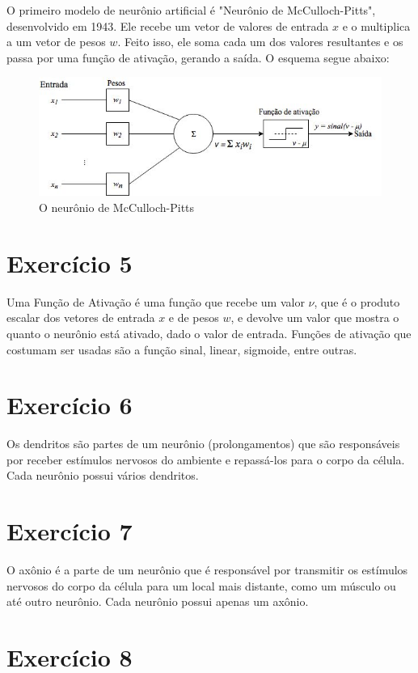 \documentclass[a4]{article}
\begin{document}
O primeiro modelo de neurônio artificial é "Neurônio de McCulloch-Pitts", desenvolvido em 1943. Ele recebe um vetor de valores de entrada $ x $ e o multiplica a um vetor de pesos $ w $. Feito isso, ele soma cada um dos valores resultantes e os passa por uma função de ativação, gerando a saída. O esquema segue abaixo:

\begin{figure}[H]
	\centering
	\includegraphics[width=0.8\linewidth]{neuronio.jpg}
	\caption{O neurônio de McCulloch-Pitts}
\end{figure}

\section*{Exercício 5}

Uma Função de Ativação é uma função que recebe um valor $ \nu $, que é o produto escalar dos vetores de entrada $ x $ e de pesos $ w $, e devolve um valor que mostra o quanto o neurônio está ativado, dado o valor de entrada. Funções de ativação que costumam ser usadas são a função sinal, linear, sigmoide, entre outras.
 
\section*{Exercício 6}

Os dendritos são partes de um neurônio (prolongamentos) que são responsáveis por receber estímulos nervosos do ambiente e repassá-los para o corpo da célula. Cada neurônio possui vários dendritos. 

\section*{Exercício 7}

O axônio é a parte de um neurônio que é responsável por transmitir os estímulos nervosos do corpo da célula para um local mais distante, como um músculo ou até outro neurônio. Cada neurônio possui apenas um axônio.

\section*{Exercício 8}
\end{document}
